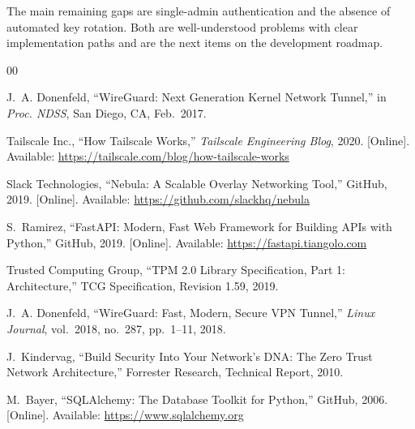\documentclass[conference]{IEEEtran}
\begin{document}
The main remaining gaps are single-admin authentication and the absence of
automated key rotation. Both are well-understood problems with clear
implementation paths and are the next items on the development roadmap.

\balance

\begin{thebibliography}{00}

J.~A. Donenfeld, ``WireGuard: Next Generation Kernel Network Tunnel,''
in \textit{Proc. NDSS}, San Diego, CA, Feb.\ 2017.

Tailscale Inc., ``How Tailscale Works,''
\textit{Tailscale Engineering Blog}, 2020.
[Online]. Available: \url{https://tailscale.com/blog/how-tailscale-works}

Slack Technologies, ``Nebula: A Scalable Overlay Networking Tool,''
GitHub, 2019. [Online]. Available: \url{https://github.com/slackhq/nebula}

S.~Ramirez, ``FastAPI: Modern, Fast Web Framework for Building APIs with Python,''
GitHub, 2019. [Online]. Available: \url{https://fastapi.tiangolo.com}

Trusted Computing Group, ``TPM 2.0 Library Specification, Part 1: Architecture,''
TCG Specification, Revision 1.59, 2019.

J.~A. Donenfeld, ``WireGuard: Fast, Modern, Secure VPN Tunnel,''
\textit{Linux Journal}, vol.~2018, no.~287, pp.~1--11, 2018.

J.~Kindervag, ``Build Security Into Your Network's DNA: The Zero Trust Network
Architecture,'' Forrester Research, Technical Report, 2010.

M.~Bayer, ``SQLAlchemy: The Database Toolkit for Python,''
GitHub, 2006. [Online]. Available: \url{https://www.sqlalchemy.org}

\end{thebibliography}
\end{document}
